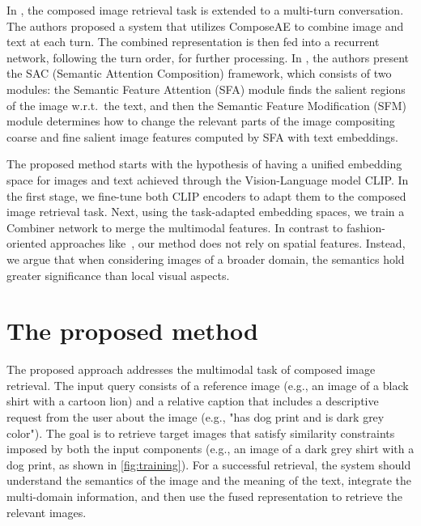\documentclass[acmlarge]{acmart}
\begin{document}
In \cite{yuan-2021-conversational}, the composed image retrieval task is extended to a multi-turn conversation. The authors proposed a system that utilizes ComposeAE \cite{Anwaar_2021_WACV} to combine image and text at each turn. The combined representation is then fed into a recurrent network, following the turn order, for further processing.
In \cite{Jandial_2022_WACV}, the authors present the SAC (Semantic Attention Composition) framework, which consists of two modules: the Semantic Feature Attention (SFA) module finds the salient regions of the image w.r.t.~the text, and then the Semantic Feature Modification (SFM) module determines how to change the relevant parts of the image compositing coarse and fine salient image features computed by SFA with text embeddings.

The proposed method starts with the hypothesis of having a unified embedding space for images and text achieved through the Vision-Language model CLIP. In the first stage, we fine-tune both CLIP encoders to adapt them to the composed image retrieval task. Next, using the task-adapted embedding spaces, we train a Combiner network to merge the multimodal features. In contrast to fashion-oriented approaches like~\cite{Chen_2020_CVPR, Lee_2021_CVPR}, our method does not rely on spatial features. Instead, we argue that when considering images of a broader domain, the semantics hold greater significance than local visual aspects.




\section{The proposed method}\label{sec:method}
The proposed approach addresses the multimodal task of composed image retrieval. The input query consists of a reference image  (e.g., an image of a black shirt with a cartoon lion) and a relative caption  that includes a descriptive request from the user about the image (e.g., "has dog print and is dark grey color"). The goal is to retrieve target images that satisfy similarity constraints imposed by both the input components (e.g., an image of a dark grey shirt with a dog print, as shown in \cref{fig:training}). For a successful retrieval, the system should understand the semantics of the image and the meaning of the text, integrate the multi-domain information, and then use the fused representation to retrieve the relevant images.
\end{document}
